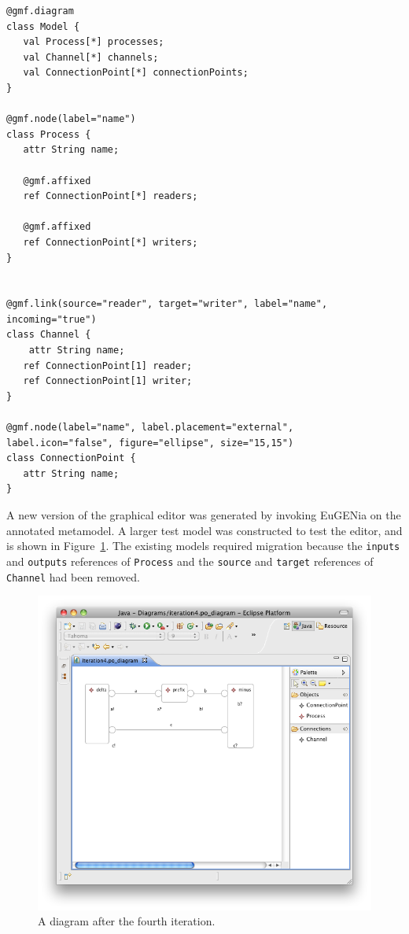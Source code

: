 \begin{lstlisting}[caption=The annotated process-oriented metamodel after four iterations, label=lst:po_it4_mm, language=Emfatic]
@gmf.diagram
class Model {
   val Process[*] processes;
   val Channel[*] channels;
   val ConnectionPoint[*] connectionPoints;
}

@gmf.node(label="name")
class Process {
   attr String name;
      
   @gmf.affixed
   ref ConnectionPoint[*] readers;
   
   @gmf.affixed
   ref ConnectionPoint[*] writers; 
}


@gmf.link(source="reader", target="writer", label="name", incoming="true")
class Channel { 
	attr String name;
   ref ConnectionPoint[1] reader;
   ref ConnectionPoint[1] writer;
}

@gmf.node(label="name", label.placement="external", label.icon="false", figure="ellipse", size="15,15")
class ConnectionPoint {
   attr String name;
}
\end{lstlisting}

A new version of the graphical editor was generated by invoking EuGENia on the annotated metamodel. A larger test model was constructed to test the editor, and is shown in Figure~\ref{fig:po_it4_model}. The existing models required migration because the \texttt{in\-pu\-ts} and \texttt{ou\-tp\-u\-ts} references of \texttt{Pr\-oc\-e\-ss} and the \texttt{s\-ou\-r\-ce} and \texttt{ta\-rg\-et} references of \texttt{Channel} had been removed.

\begin{figure}[htbp]
	\centering
		\includegraphics[scale=0.5]{A.2.ProcessOriented/images/4_model.png}
	\caption{A diagram after the fourth iteration.}
	\label{fig:po_it4_model}
\end{figure}

